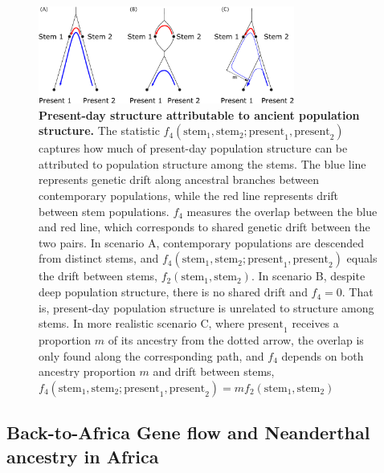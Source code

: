 \documentclass[]{article}
\begin{document}
\begin{figure}[ht]
    \centering
    \includegraphics[width=0.75\textwidth]{figures/supp-f4-scenarios}
    \caption{
        \textbf{Present-day structure attributable to ancient population structure.}
        The statistic 
        $f_4(\text{stem}_1, \text{stem}_2; \text{present}_1, \text{present}_2)$
        captures how much of present-day population structure can be attributed to 
        population structure among the stems. The blue line represents genetic drift 
        along ancestral branches between contemporary populations, while the red line 
        represents drift between stem populations. $f_4$ measures the overlap 
        between the blue and red line, which corresponds to shared genetic drift 
        between the two pairs. 
        In scenario A, contemporary populations are descended from distinct stems, and 
        $f_4(\text{stem}_1, \text{stem}_2; \text{present}_1, \text{present}_2)$
        equals the drift between stems, $f_2(\text{stem}_1, \text{stem}_2)$.
        In scenario B, despite deep population structure, there is no shared drift
        and $f_4=0$. That is, present-day population structure is unrelated to
        structure among stems. In more realistic scenario C, where $\text{present}_1$
        receives a proportion $m$ of its ancestry from the dotted arrow, the overlap
        is only found along the corresponding path, and $f_4$ depends on both
        ancestry proportion $m$ and drift between stems,
        $f_4(\text{stem}_1, \text{stem}_2; \text{present}_1, \text{present}_2)
        = mf_2(\text{stem}_1, \text{stem}_2)$
    }
    \label{fig:supp-f4-scenarios}
\end{figure}

\subsection{Back-to-Africa Gene flow and Neanderthal ancestry in Africa} 
\end{document}
